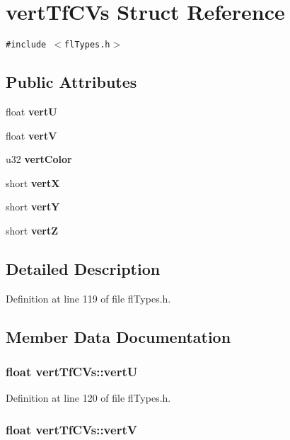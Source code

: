 \section{vert\-Tf\-CVs Struct Reference}
\label{structvertTfCVs}
{\tt \#include $<$fl\-Types.h$>$}

\subsection*{Public Attributes}
\begin{CompactItemize}
\item 
float {\bf vert\-U}
\item 
float {\bf vert\-V}
\item 
u32 {\bf vert\-Color}
\item 
short {\bf vert\-X}
\item 
short {\bf vert\-Y}
\item 
short {\bf vert\-Z}
\end{CompactItemize}


\subsection{Detailed Description}




Definition at line 119 of file fl\-Types.h.

\subsection{Member Data Documentation}
\subsubsection{\setlength{\rightskip}{0pt plus 5cm}float {\bf vert\-Tf\-CVs::vert\-U}}\label{structvertTfCVs_335e8c1f7324180b773e3bc7e4e67b73}




Definition at line 120 of file fl\-Types.h.
\subsubsection{\setlength{\rightskip}{0pt plus 5cm}float {\bf vert\-Tf\-CVs::vert\-V}}\label{structvertTfCVs_a4e123667decc709f1264c197cbd812a}




